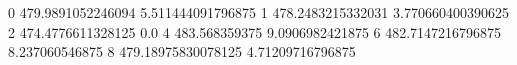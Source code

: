 0 479.9891052246094 5.511444091796875
1 478.2483215332031 3.770660400390625
2 474.4776611328125 0.0
4 483.568359375 9.0906982421875
6 482.7147216796875 8.237060546875
8 479.18975830078125 4.71209716796875

